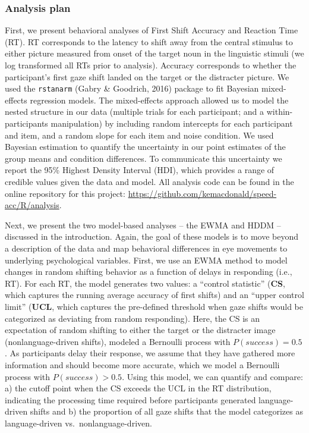 \documentclass[10pt, letterpaper]{article}
\begin{document}
\subsubsection{Analysis plan}\label{analysis-plan}

First, we present behavioral analyses of First Shift Accuracy and
Reaction Time (RT). RT corresponds to the latency to shift away from the
central stimulus to either picture measured from onset of the target
noun in the linguistic stimuli (we log transformed all RTs prior to
analysis). Accuracy corresponds to whether the participant's first gaze
shift landed on the target or the distracter picture. We used the
\texttt{rstanarm} (Gabry \& Goodrich, 2016) package to fit Bayesian
mixed-effects regression models. The mixed-effects approach allowed us
to model the nested structure in our data (multiple trials for each
participant; and a within-participants manipulation) by including random
intercepts for each participant and item, and a random slope for each
item and noise condition. We used Bayesian estimation to quantify the
uncertainty in our point estimates of the group means and condition
differences. To communicate this uncertainty we report the 95\% Highest
Density Interval (HDI), which provides a range of credible values given
the data and model. All analysis code can be found in the online
repository for this project:
\url{https://github.com/kemacdonald/speed-acc/R/analysis}.

Next, we present the two model-based analyses -- the EWMA and HDDM --
discussed in the introduction. Again, the goal of these models is to
move beyond a description of the data and map behavioral differences in
eye movements to underlying psychological variables. First, we use an
EWMA method to model changes in random shifting behavior as a function
of delays in responding (i.e., RT). For each RT, the model generates two
values: a ``control statistic'' (\textbf{CS}, which captures the running
average accuracy of first shifts) and an ``upper control limit''
(\textbf{UCL}, which captures the pre-defined threshold when gaze shifts
would be categorized as deviating from random responding). Here, the CS
is an expectation of random shifting to either the target or the
distracter image (nonlanguage-driven shifts), modeled a Bernoulli
process with \(P(success) = 0.5\). As participants delay their response,
we assume that they have gathered more information and should become
more accurate, which we model a Bernoulli process with
\(P(success) > 0.5\). Using this model, we can quantify and compare: a)
the cutoff point when the CS exceeds the UCL in the RT distribution,
indicating the processing time required before participants generated
language-driven shifts and b) the proportion of all gaze shifts that the
model categorizes as language-driven vs.~nonlanguage-driven.
\end{document}
